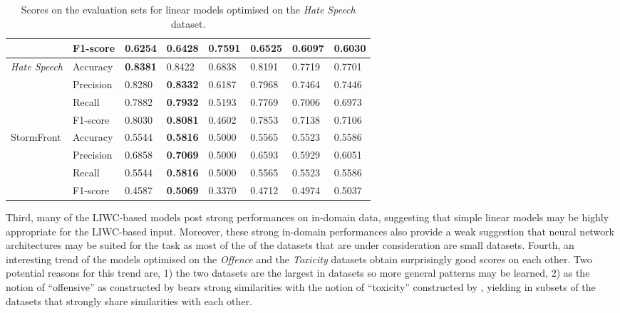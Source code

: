 \begin{table}[]
\begin{minipage}{0.42\paperheight}
{\begin{tabular}{ll|ll|ll|ll}
                                           & F1-score  & 0.6254       & 0.6428           & \bf{0.7591} & 0.6525        & 0.6097      & 0.6030      \\ \hline
    \multirow{4}{*}{\textit{Hate Speech}}  & Accuracy  & \bf{0.8381}  & 0.8422           & 0.6838      & 0.8191        & 0.7719      & 0.7701      \\
                                           & Precision & 0.8280       & \bf{0.8332}      & 0.6187      & 0.7968        & 0.7464      & 0.7446      \\
                                           & Recall    & 0.7882       & \bf{0.7932}      & 0.5193      & 0.7769        & 0.7006      & 0.6973      \\
                                           & F1-score  & 0.8030       & \bf{0.8081}      & 0.4602      & 0.7853        & 0.7138      & 0.7106      \\ \hline
    \multirow{4}{*}{StormFront}            & Accuracy  & 0.5544       & \bf{0.5816}      & 0.5000      & 0.5565        & 0.5523      & 0.5586      \\
                                           & Precision & 0.6858       & \bf{0.7069}      & 0.5000      & 0.6593        & 0.5929      & 0.6051      \\
                                           & Recall    & 0.5544       & \bf{0.5816}      & 0.5000      & 0.5565        & 0.5523      & 0.5586      \\
                                           & F1-score  & 0.4587       & \bf{0.5069}      & 0.3370      & 0.4712        & 0.4974      & 0.5037
    \end{tabular}%
    }
    \caption{Scores on the evaluation sets for linear models optimised on the \textit{Hate Speech} dataset.}
    \label{tab:linear_hatespeech_baselines}
\end{minipage}
\end{table}

Third, many of the LIWC-based models post strong performances on in-domain data, suggesting that simple linear models may be highly appropriate for the LIWC-based input.
Moreover, these strong in-domain performances also provide a weak suggestion that neural network architectures may be suited for the task as most of the of the datasets that are under consideration are small datasets.
Fourth, an interesting trend of the models optimised on the \textit{Offence} and the \textit{Toxicity} datasets obtain surprisingly good scores on each other. 
Two potential reasons for this trend are, 1) the two datasets are the largest in datasets so more general patterns may be learned, 2) as the notion of ``offensive'' as constructed by \citet{Davidson:2017} bears strong similarities with the notion of ``toxicity'' constructed by \citet{Wulczyn:2017}, yielding in subsets of the datasets that strongly share similarities with each other.

